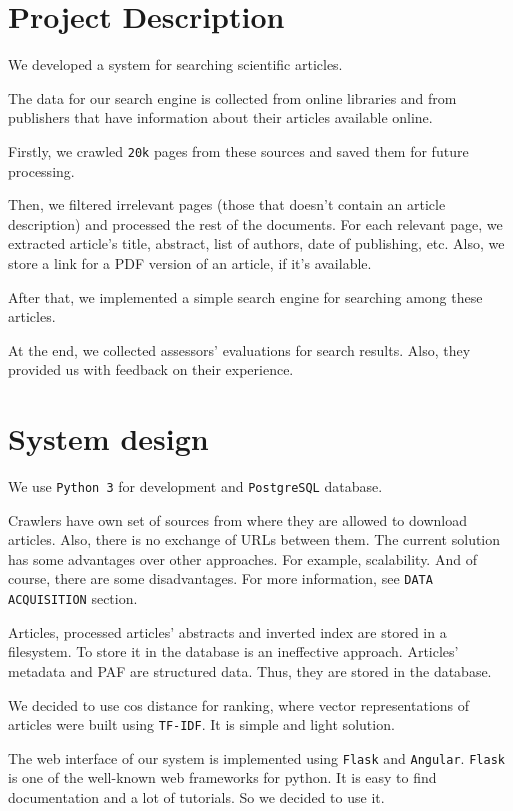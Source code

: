 \section{Project Description}

We developed a system for searching scientific articles.

The data for our search engine is collected from online libraries and from publishers that have information about their articles available online.

Firstly, we crawled \texttt{20k} pages from these sources and saved them for future processing.

Then, we filtered irrelevant pages (those that doesn't contain an article description) and processed the rest of the documents.
For each relevant page, we extracted article's title, abstract, list of authors, date of publishing, etc.
Also, we store a link for a PDF version of an article, if it's available.

After that, we implemented a simple search engine for searching among these articles. 

At the end, we collected assessors' evaluations for search results. 
Also, they provided us with feedback on their experience.

\section{System design}
We use \texttt{Python 3}  for development and \texttt{PostgreSQL} database.

Crawlers have own set of sources from where they are allowed to download articles. Also, there is no exchange of URLs between them. The current solution has some advantages over other approaches. For example, scalability. And of course, there are some disadvantages. For more information, see \texttt{DATA ACQUISITION} section.

Articles, processed articles' abstracts and inverted index are stored in a filesystem. To store it in the database is an ineffective approach.
Articles' metadata and PAF are structured data. Thus, they are stored in the database.

We decided to use cos distance for ranking, where vector representations of  articles were built using \texttt{TF-IDF}. It is simple and light solution.

The web interface of our system is implemented using \texttt{Flask} and \texttt{Angular}. \texttt{Flask} is one of the well-known web frameworks for python. It is easy to find documentation and a lot of tutorials. So we decided to use it. 

